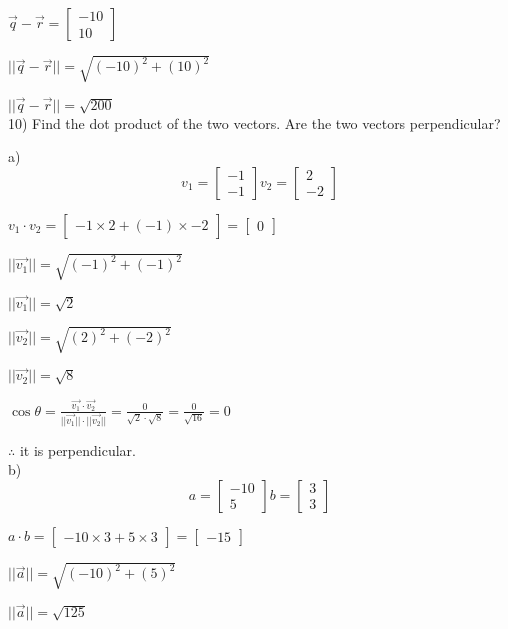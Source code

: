 \documentclass[a4paper]{article}
\begin{document}
$\vec{q}-\vec{r} = \begin{bmatrix}
-10\\
10
\end{bmatrix}$

$||\vec{q}-\vec{r}|| = \sqrt{(-10)^2+(10)^2}$

$||\vec{q}-\vec{r}|| = \sqrt{200}$\\

10) Find the dot product of the two vectors. Are the two vectors perpendicular?

a) $$v_1 = \begin{bmatrix}
-1\\
-1
\end{bmatrix} v_2 =
\begin{bmatrix}
2\\
-2
\end{bmatrix}$$

$v_1 \cdot v_2 = \begin{bmatrix}
-1\times2+(-1)\times-2
\end{bmatrix} = \begin{bmatrix}
0
\end{bmatrix}$

$||\vec{v_1}|| = \sqrt{(-1)^2+(-1)^2}$

$||\vec{v_1}|| = \sqrt{2}$

$||\vec{v_2}|| = \sqrt{(2)^2+(-2)^2}$

$||\vec{v_2}|| = \sqrt{8}$

$\cos\theta = \frac{\vec{v_1}\cdot\vec{v_2}}{||\vec{v_1}||\cdot||\vec{v_2}||} = \frac{0}{\sqrt{2}\cdot\sqrt{8}} = \frac{0}{\sqrt{16}} = 0$ 

$\therefore$ it is perpendicular.\\

b) $$a = \begin{bmatrix}
-10\\
5
\end{bmatrix} b = \begin{bmatrix}
3\\
3
\end{bmatrix}$$

$a \cdot b = \begin{bmatrix}
-10\times3+5\times3
\end{bmatrix} =
\begin{bmatrix}
-15
\end{bmatrix}$

$||\vec{a}|| = \sqrt{(-10)^2+(5)^2}$

$||\vec{a}|| = \sqrt{125}$
\end{document}

